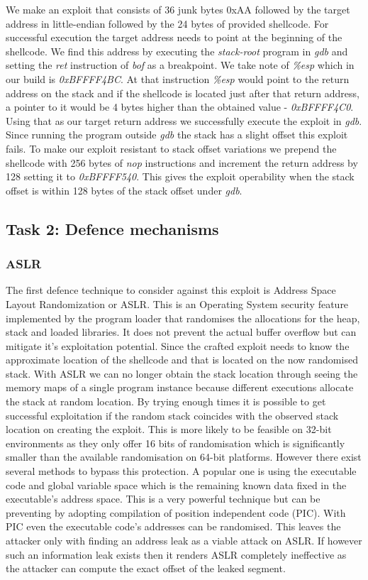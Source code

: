 We make an exploit that consists of 36 junk bytes 0xAA followed by the target address in little-endian followed by the 24 bytes of provided shellcode. For successful execution the target address needs to point at the beginning of the shellcode. We find this address by executing the \emph{stack-root} program in \emph{gdb} and setting the \emph{ret} instruction of \emph{bof} as a breakpoint. We take note of \emph{\%esp} which in our build is \emph{0xBFFFF4BC}. At that instruction \emph{\%esp} would point to the return address on the stack and if the shellcode is located just after that return address, a pointer to it would be 4 bytes higher than the obtained value - \emph{0xBFFFF4C0}. Using that as our target return address we successfully execute the exploit in \emph{gdb}. Since running the program outside \emph{gdb} the stack has a slight offset this exploit fails. To make our exploit resistant to stack offset variations we prepend the shellcode with 256 bytes of \emph{nop} instructions and increment the return address by 128 setting it to \emph{0xBFFFF540}. This gives the exploit operability when the stack offset is within 128 bytes of the stack offset under \emph{gdb}.

\subsection{Task 2: Defence mechanisms}
\subsubsection{ASLR}
The first defence technique to consider against this exploit is Address Space Layout Randomization or ASLR. This is an Operating System security feature implemented by the program loader that randomises the allocations for the heap, stack and loaded libraries. It does not prevent the actual buffer overflow but can mitigate it's exploitation potential. Since the crafted exploit needs to know the approximate location of the shellcode and that is located on the now randomised stack. With ASLR we can no longer obtain the stack location through seeing the memory maps of a single program instance because different executions allocate the stack at random location. By trying enough times it is possible to get successful exploitation if the random stack coincides with the observed stack location on creating the exploit. This is more likely to be feasible on 32-bit environments as they only offer 16 bits of randomisation which is significantly smaller than the available randomisation on 64-bit platforms. However there exist several methods to bypass this protection. A popular one is using the executable code and global variable space  which is the remaining known data fixed in the executable's address space. This is a very powerful technique but can be preventing by adopting compilation of position independent code (PIC). With PIC even the executable code's addresses can be randomised. This leaves the attacker only with finding an address leak as a viable attack on ASLR. If however such an information leak exists then it renders ASLR completely ineffective as the attacker can compute the exact offset of the leaked segment.\\
